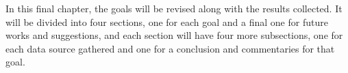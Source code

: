 



In this final chapter, the goals will be revised along with the results collected. It will be divided into four sections, one for each goal and a final one for future works and suggestions, and each section will have four more subsections, one for each data source gathered and one for a conclusion and commentaries for that goal.



